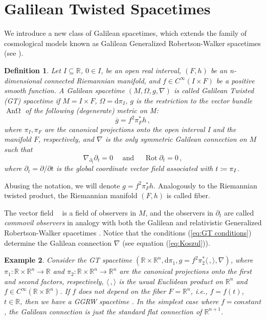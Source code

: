 \documentclass[12pt]{article}
\newcommand{\diff}{\mathrm{d}}
\newcommand{\coloneq}{\vcentcolon\mathrel{\mkern -1.2mu}\mathrel{=}}
\DeclareMathOperator{\pt}{\partial_t}
\DeclareMathOperator{\An}{\text{An}\Omega}
\newtheorem{defi}{Definition}[section]
\newtheorem{ex}[defi]{Example}
\def\R{\mathbb R}
\begin{document}
\section{Galilean Twisted Spacetimes}\label{GT}
We introduce a new class of Galilean spacetimes, which extends the family of cosmological models known as Galilean Generalized Robertson-Walker spacetimes (see \cite{GGRW,Muler1983}).

\begin{defi}\label{defi:GT}
    Let $I\subseteq \R$, $0\in I$, be an open real interval, $(F,h)$ be an n-dimensional connected Riemannian manifold, and $f\in C^{\infty}(I\times F)$ be a positive smooth function. A Galilean spacetime $(M,\Omega, g, \nabla)$ is called \emph{Galilean Twisted} (GT) spacetime if $M=I\times F$, $\Omega = \diff \pi_I$, $g$ is the restriction to the vector bundle $\An$ of the following (degenerate) metric on M:
    \begin{equation}
        \overline{g} = f^2 \pi_F^* h\,,
    \end{equation}
    where $\pi_I, \pi_F$ are the canonical projections onto the open interval I and the manifold $F$, respectively, and $\nabla$ is the only symmetric Galilean connection on $M$ such that
    \begin{equation}\label{eq:GT conditions}
        \nabla_{\partial_t} \partial_t=0 \quad \text { and } \quad \operatorname{Rot} \partial_t=0\,,
    \end{equation}
    where $\partial_t=\partial / \partial t$ is the global coordinate vector field associated with $t\coloneq\pi_I$.
\end{defi}

Abusing the notation, we will denote $g=f^2 \pi_F^* h$.
Analogously to the Riemannian twisted product, the Riemannian manifold $(F,h)$ is called fiber.


The vector field $\pt$ is a field of observers in $M$, and the observers in $\partial_t$ are called \textit{commovil observers} in analogy with both the Galilean and relativistic Generalized Robertson-Walker spacetimes \cite{AliasRomeroSanchez1995, GGRW}. Notice that the conditions (\ref{eq:GT conditions}) determine the Galilean connection $\nabla$ (see equation (\ref{eq:Koszul})).

\begin{ex}
    Consider the GT spacetime $(\R\times \R^n, \diff \pi_1, g=f^2 \pi_2^* \langle\,, \rangle, \nabla)$, where $\pi_1 \colon \R\times \R^n \to \R$ and $\pi_2\colon \R\times \R^n \to \R^n$ are the canonical projections onto the first and second factors, respectively, $\langle\,,\rangle$ is the usual Euclidean product on $\R^n$ and $f\in C^\infty(\R\times \R^n)$. If $f$ does not depend on the fiber $F=\R^n$, i.e.,  $f = f(t)$, $t\in \R$, then we have a GGRW spacetime \cite{GGRW}. In the simplest case where $f=constant$, the Galilean connection is just the standard flat connection of $\R^{n+1}$.  
\end{ex}
\end{document}
